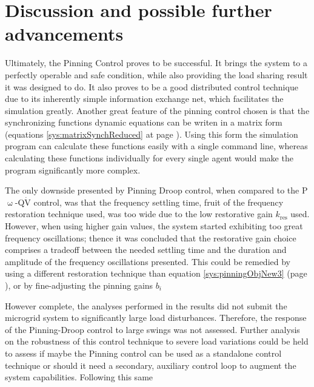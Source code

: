 \section{Discussion and possible further advancements} %

	Ultimately, the Pinning Control proves to be successful. It brings the system to a perfectly operable and safe condition, while also providing the load sharing result it was designed to do. It also proves to be a good distributed control technique due to its inherently simple information exchange net, which facilitates the simulation greatly. Another great feature of the pinning control chosen is that the synchronizing functions dynamic equations can be writen in a matrix form (equations \eqref{sys:matrixSynchReduced} at page \pageref{sys:matrixSynchReduced}). Using this form the simulation program can calculate these functions easily with a single command line, whereas calculating these functions individually for every single agent would make the program significantly more complex.

	The only downside presented by Pinning Droop control, when compared to the P$\upomega$-Q$\dot{\text{V}}$ control, was that the frequency settling time, fruit of the frequency restoration technique used, was too wide due to the low restorative gain $k_{\text{res}}$ used. However, when using higher gain values, the system started exhibiting too great frequency oscillations; thence it was concluded that the restorative gain choice comprises a tradeoff between the needed settling time and the duration and amplitude of the frequency oscillations presented. This could be remedied by using a different restoration technique than equation \eqref{sys:pinningObjNew3} (page \pageref{sys:pinningObjNew3}), or by fine-adjusting the pinning gains $b_i$ 

	However complete, the analyses performed in the results did not submit the microgrid system to significantly large load disturbances. Therefore, the response of the Pinning-Droop control to large swings was not assessed. Further analysis on the robustness of this control technique to severe load variations could be held to assess if maybe the Pinning control can be used as a standalone control technique or should it need a secondary, auxiliary control loop to augment the system capabilities. Following this same 

